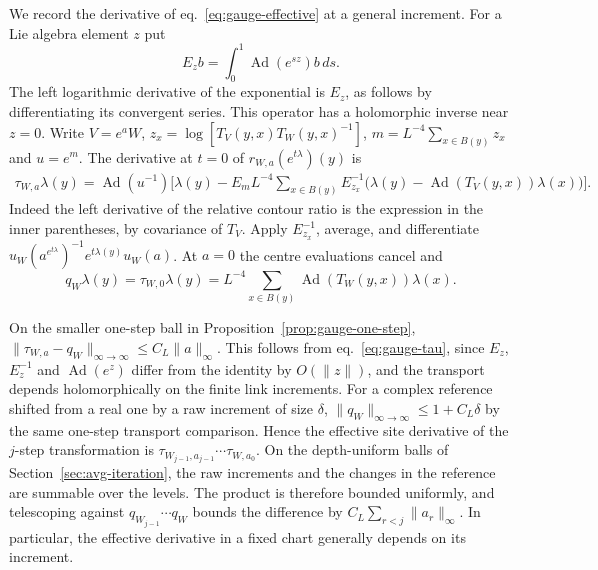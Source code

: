 \documentclass[11pt,letterpaper,reqno]{amsart}
\numberwithin{equation}{section}
\renewcommand{\eqref}[1]{\textup{eq.~\ref{#1}}}
\theoremstyle{definition}
\theoremstyle{remark}
\begin{document}
We record the derivative of \eqref{eq:gauge-effective} at a general
increment. For a Lie algebra element \(z\) put
\[
 E_z b=\int_0^1\operatorname{Ad}(e^{s z})b\,ds .
\]
The left logarithmic derivative of the exponential is \(E_z\), as
follows by differentiating its convergent series. This operator has
a holomorphic inverse near \(z=0\). Write \(V=e^aW\),
\(z_x=\log[T_V(y,x)T_W(y,x)^{-1}]\),
\(m=L^{-4}\sum_{x\in B(y)}z_x\) and \(u=e^m\).
The derivative at \(t=0\) of \(r_{W,a}(e^{t\lambda})(y)\) is
\begin{equation}\label{eq:gauge-tau}
 \begin{split}
 \tau_{W,a}\lambda(y)=\operatorname{Ad}(u^{-1})\Big[
  \lambda(y)-E_m L^{-4}\sum_{x\in B(y)} E_{z_x}^{-1}
  \big(\lambda(y)-\operatorname{Ad}(T_V(y,x))\lambda(x)\big)\Big].
 \end{split}
\end{equation}
Indeed the left derivative of the relative contour ratio is the
expression in the inner parentheses, by covariance of \(T_V\).
Apply \(E_{z_x}^{-1}\), average, and differentiate
\(u_W(a^{e^{t\lambda}})^{-1}e^{t\lambda(y)}u_W(a)\).
At \(a=0\) the centre evaluations cancel and
\begin{equation}\label{eq:gauge-site-one}
 q_W\lambda(y)=\tau_{W,0}\lambda(y)
   =L^{-4}\sum_{x\in B(y)}
        \operatorname{Ad}(T_W(y,x))\lambda(x).
\end{equation}

On the smaller one-step ball in Proposition~\ref{prop:gauge-one-step},
\(\|\tau_{W,a}-q_W\|_{\infty\to\infty}\le C_L\|a\|_\infty\).
This follows from \eqref{eq:gauge-tau}, since \(E_z\),
\(E_z^{-1}\) and \(\operatorname{Ad}(e^z)\) differ from the
identity by \(O(\|z\|)\), and the transport depends holomorphically
on the finite link increments. For a complex reference shifted
from a real one by a raw increment of size \(\delta\),
\(\|q_W\|_{\infty\to\infty}\le 1+C_L\delta\) by the same
one-step transport comparison. Hence the effective site derivative
of the \(j\)-step transformation is
\(\tau_{W_{j-1},a_{j-1}}\cdots\tau_{W,a_0}\).
On the depth-uniform balls of Section~\ref{sec:avg-iteration},
the raw increments and the changes in the reference are summable
over the levels. The product is therefore bounded uniformly, and
telescoping against \(q_{W_{j-1}}\cdots q_W\) bounds the difference
by \(C_L\sum_{r<j}\|a_r\|_\infty\). In particular, the effective
derivative in a fixed chart generally depends on its increment.
\end{document}
